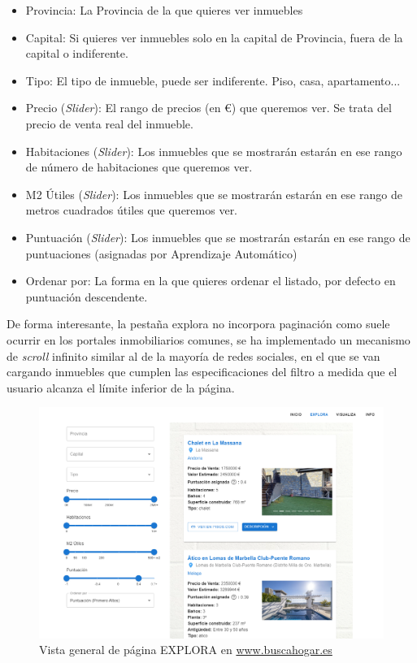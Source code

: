 \begin{itemize}
    \item Provincia: La Provincia de la que quieres ver inmuebles
    \item Capital: Si quieres ver inmuebles solo en la capital de Provincia, fuera de la capital o indiferente.
    \item Tipo: El tipo de inmueble, puede ser indiferente. Piso, casa, apartamento...
    \item Precio (\textit{Slider}): El rango de precios (en €) que queremos ver. Se trata del precio de venta real del inmueble.
    \item Habitaciones (\textit{Slider}): Los inmuebles que se mostrarán estarán en ese rango de número de habitaciones que queremos ver.
    \item M2 Útiles (\textit{Slider}):  Los inmuebles que se mostrarán estarán en ese rango de metros cuadrados útiles que queremos ver.
    \item Puntuación (\textit{Slider}): Los inmuebles que se mostrarán estarán en ese rango de puntuaciones (asignadas por Aprendizaje Automático)
    \item Ordenar por: La forma en la que quieres ordenar el listado, por defecto en puntuación descendente. 
\end{itemize}

De forma interesante, la pestaña explora no incorpora paginación como suele ocurrir en los portales inmobiliarios comunes, se ha implementado un mecanismo de \textit{scroll} infinito similar al de la mayoría de redes sociales, en el que se van cargando inmuebles que cumplen las especificaciones del filtro a medida que el usuario alcanza el límite inferior de la página.

\begin{figure}[ht]
    \centering
	\includegraphics[width=1\textwidth]{img/explora_1.PNG}
	\caption{Vista general de página EXPLORA en \url{www.buscahogar.es}}
	\label{fig:explora_1}
\end{figure}

